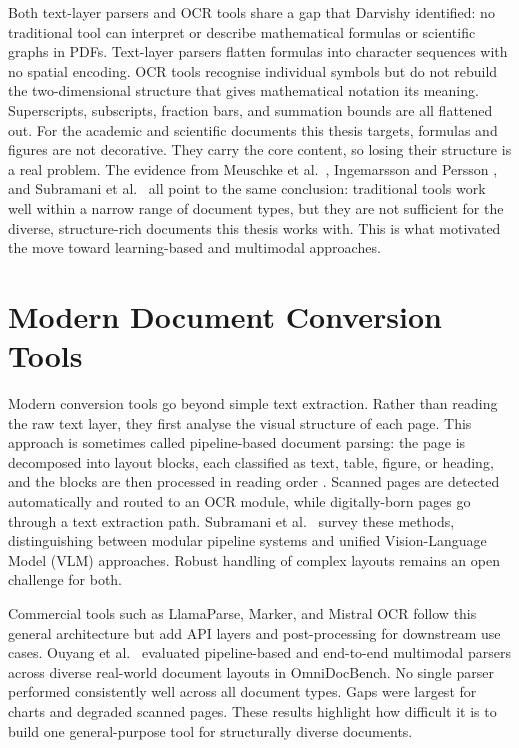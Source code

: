 Both text-layer parsers and OCR tools share a gap that Darvishy
\autocite{darvishy2018} identified: no traditional tool can interpret or describe
mathematical formulas or scientific graphs in PDFs. Text-layer parsers flatten
formulas into character sequences with no spatial encoding. OCR tools recognise
individual symbols but do not rebuild the two-dimensional structure that gives
mathematical notation its meaning. Superscripts, subscripts, fraction bars,
and summation bounds are all flattened out. For the academic and scientific documents
this thesis targets, formulas and figures are not decorative. They carry
the core content, so losing their structure is a real problem. The evidence
from Meuschke et al.\ \autocite{meuschke2023}, Ingemarsson and Persson
\autocite{ingemarsson2024}, and Subramani et al.\ \autocite{subramani2020} all point
to the same conclusion: traditional tools work well within a narrow range of
document types, but they are not sufficient for the diverse, structure-rich
documents this thesis works with. This is what motivated the move toward
learning-based and multimodal approaches.

\section{Modern Document Conversion Tools}

Modern conversion tools go beyond simple text extraction. Rather than reading the
raw text layer, they first analyse the visual structure of each page. This approach
is sometimes called pipeline-based document parsing: the page is decomposed into
layout blocks, each classified as text, table, figure, or heading, and the blocks
are then processed in reading order \autocite{whitington2012}. Scanned pages are detected
automatically and routed to an OCR module, while digitally-born pages go through a
text extraction path. Subramani et al.\ \autocite{subramani2020} survey these methods,
distinguishing between modular pipeline systems and unified Vision-Language Model
(VLM) approaches. Robust handling of complex layouts remains an open challenge
for both.

Commercial tools such as LlamaParse, Marker, and Mistral OCR follow this general
architecture but add API layers and post-processing for downstream use cases.
Ouyang et al.\ \autocite{omnidocbench2025} evaluated pipeline-based and end-to-end
multimodal parsers across diverse real-world document layouts in OmniDocBench.
No single parser performed consistently well across all document types. Gaps were
largest for charts and degraded scanned pages. These results highlight how
difficult it is to build one general-purpose tool for structurally diverse
documents.

